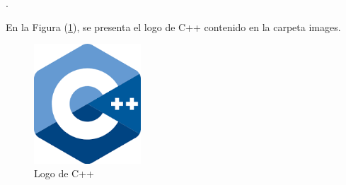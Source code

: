 \documentclass{article}
\begin{document}
.











En la Figura (\ref{fig:cpplogo}), se presenta el logo de C++ contenido en la carpeta images.

\begin{figure}[h]
\includegraphics[width=4cm]{cpplogo.png}
\centering
\caption{Logo de C++}
\label{fig:cpplogo}
\end{figure}




\end{document}
